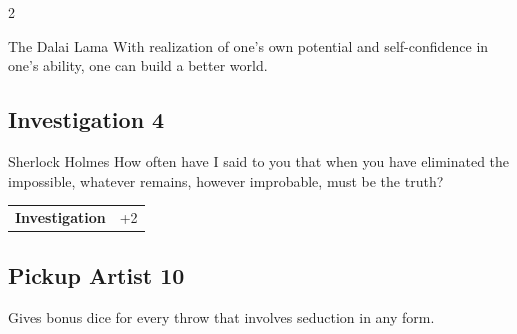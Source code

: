 \begin{multicols}{2}
\begin{tcolorbox}
\begin{pquote}{The Dalai Lama}
With realization of one’s own potential and self-confidence in one’s ability, one can build a better world.
\end{pquote}

\vspace{3mm}



\end{tcolorbox}

\begin{tcolorbox}
    \subsection*{Investigation \hfill \small{4 }}
    \tcblower


\begin{pquote}{Sherlock Holmes}
How often have I said to you that when you have eliminated the impossible, whatever remains, however improbable, must be the truth?
\end{pquote}

\vspace{3mm}

\begin{tabular}{@{}ll@{}}
    \textbf{Investigation} & +2\\
\end{tabular}


\end{tcolorbox}

\begin{tcolorbox}
    \subsection*{Pickup Artist \hfill \small{10 }}
    \tcblower
Gives bonus dice for every throw that involves seduction in any form.


\vspace{3mm}



\end{tcolorbox}
\end{multicols}
